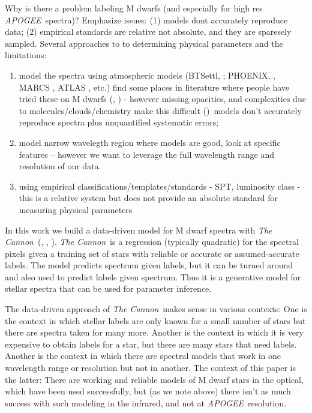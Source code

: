 \documentclass[modern]{aastex62}
\newcommand{\apogee}{\textsl{APOGEE}}
\newcommand{\thecannon}{\textsl{The Cannon}}
\begin{document}
Why is there a problem labeling M dwarfs (and especially for high res \apogee\ spectra)? Emphasize issues: (1) models dont accurately reproduce data; (2) empirical standards are relative not absolute, and they are sparesely sampled. Several approaches to to determining physical parameters and the limitations:

\begin{enumerate}
\item model the spectra using atmospheric models (BTSettl, \citealt{Allard:2011}; PHOENIX, \citealt{Husser:2013}, MARCS \citealt{Gustafsson:2008}, ATLAS \citealt{Castelli:2004}, etc.) find some places in literature where people have tried these on M dwarfs (\citealt{Rajpurohit:2014}, \citealt{Rajpurohit:2018}) - however missing opacities, and complexities due to molecules/clouds/chemistry make this difficult (\citealt{Allard:2013})--models don't accurately reproduce spectra plus unquantified systematic errors; 

\item model narrow wavelegth region where models are good, look at specific features -- however we want to leverage the full wavelength range and resolution of our data.

\item using empirical classifications/templates/standards - SPT, luminosity class - this is a relative system but does not provide an absolute standard for measuring physical parameters
\end{enumerate}

In this work we build a data-driven model for M dwarf spectra with \thecannon\ (\citealt{Ness:2015}, \citealt{Ho:2017a}, \citealt{Casey:2016}).
\thecannon\ is a regression (typically quadratic) for the spectral pixels given a training
set of stars with reliable or accurate or assumed-accurate labels.
The model predicts spectrum given labels, but it can be turned around and also
used to predict labels given spectrum.
Thus it is a generative model for stellar spectra that can be used for parameter inference.

The data-driven approach of \thecannon\ makes sense in various contexts:
One is the context in which stellar labels are only known for a small number of stars
but there are spectra taken for many more.
Another is the context in which it is very expensive to obtain labels for a star, but
there are many stars that need labels.
Another is the context in which there are spectral models that work in one wavelength
range or resolution but not in another.
The context of this paper is the latter:
There are working and reliable models of M dwarf stars in the optical, which have been
used successfully, but (as we note above) there isn't as much success with such modeling in the infrared, and not at \apogee\ resolution.
\end{document}

